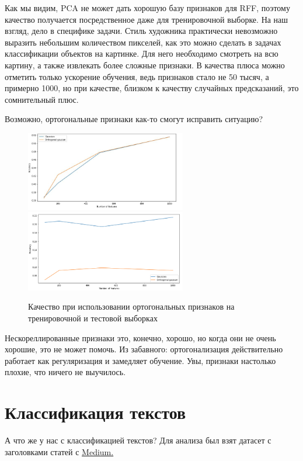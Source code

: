 \documentclass{article}
\newcommand{\bibref}[3]{#2\hyperlink{#1}{\color{blue}#3}}
\begin{document}
Как мы видим, PCA не может дать хорошую базу признаков для RFF, поэтому качество получается посредственное даже для тренировочной выборке. На наш взгляд, дело в специфике задачи. Стиль художника практически невозможно выразить небольшим количеством пикселей, как это можно сделать в задачах классификации объектов на картинке. Для него необходимо смотреть на всю картину, а также извлекать более сложные признаки. В качества плюса можно отметить только ускорение обучения, ведь признаков стало не 50 тысяч, а примерно 1000, но при качестве, близком к качеству случайных предсказаний, это сомнительный плюс.

\bigskip

Возможно, ортогональные признаки как-то смогут исправить ситуацию?

\begin{figure}[H]
    \centering
    \includegraphics[width=7cm]{images/orthogonal_train.jpg}
    \includegraphics[width=7cm]{images/orthogonal_test.png}
    
    \caption{Качество при использовании ортогональных признаков на тренировочной и тестовой выборках}
    \label{fig:my_label}
\end{figure}{}

Нескореллированные признаки это, конечно, хорошо, но когда они не очень хорошие, это не может помочь. Из забавного: ортогонализация действительно работает как регуляризация и замедляет обучение. Увы, признаки настолько плохие, что ничего не выучилось.

\section{Классификация текстов}

А что же у нас с классификацией текстов? Для анализа был взят датасет с заголовками статей с \bibref{medium}{}{Medium.}
\end{document}
